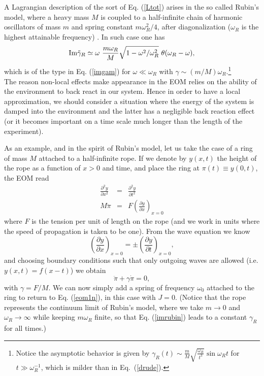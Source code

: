\documentclass[11pt,amsmath,floats,floatfix,nofootinbib,secnumarabic, superscriptaddress, tightenlines]{revtex4}
\newcommand{\beq}{\begin{equation}}
\newcommand{\eeq}{\end{equation}}
\newcommand{\bea}{\begin{eqnarray}}
\newcommand{\eea}{\end{eqnarray}}
\begin{document}
{A Lagrangian description of the sort of Eq. (\ref{Ltot}) arises in the so called Rubin's model, where a heavy mass $M$ is coupled to a half-infinite chain of harmonic oscillators of mass $m$ and spring constant $m\omega_R^2/4$, after diagonalization ($\omega_R$ is the highest attainable frequency) \cite{weiss}. In such case one has \cite{weiss}
\beq
\label{imrubin}
{\rm Im} \tilde\gamma_R \simeq \omega~\frac{m \omega_R}{M} \sqrt{1-\omega^2/\omega_R^2}~\theta(\omega_R-\omega),
\eeq
which is of the type in Eq. (\ref{imgam}) for $\omega \ll \omega_R$ with $\gamma \sim (m/M)\omega_R$.\footnote{Notice the asymptotic behavior is given by $\gamma_R(t) \sim \frac{m}{M} \sqrt{\frac{\omega_R}{t^3}}\sin\omega_R t$ for $t \gg \omega_R^{-1}$, which is milder than in Eq.~(\ref{drude}).}\\

The reason non-local effects make appearance in the EOM relies on the ability of the environment to back react in our system. Hence in order to have a local approximation, we should consider a situation where the energy of the system is damped into the environment and the latter has a negligible back reaction effect (or it becomes important on a time scale much longer than the length of the experiment).

As an example, and in the spirit of Rubin's model, let us take the case of a ring of mass $M$ attached to a half-infinite rope. If we denote by $y(x,t)$ the height of the rope as a function of $x>0$ and time, and place the ring at $\pi(t) \equiv y(0,t)$, the EOM read
\bea
\frac{\partial^2 y}{\partial x^2} &=& \frac{\partial^2 y}{\partial t^2} \\
M \ddot \pi &=& F \left(\frac{\partial y}{\partial x}\right)_{x=0}
\eea
where $F$ is the tension per unit of length on the rope (and we work in units where the speed of propagation is taken to be one). From the wave equation we know
\beq
\left(\frac{\partial y}{\partial x}\right)_{x=0}
= \pm \left(\frac{\partial y}{\partial t}\right)_{x=0},
\eeq
and choosing boundary conditions such that only outgoing waves are allowed (i.e. $y(x,t) = f(x-t)$) we obtain
\beq
\ddot \pi + \gamma \dot \pi =0,
\eeq
with $\gamma = F/M$. We can now simply add a spring of frequency $\omega_0$ attached to the ring to return to Eq. (\ref{eom1n}), in this case with $J=0$. (Notice that the rope represents the continuum limit of Rubin's model, where we take $m\to 0$ and $\omega_R\to\infty$ while keeping  $m\omega_R$ finite, so that Eq. (\ref{imrubin}) leads to a constant $\gamma_R$ for all times.)

}
\end{document}
